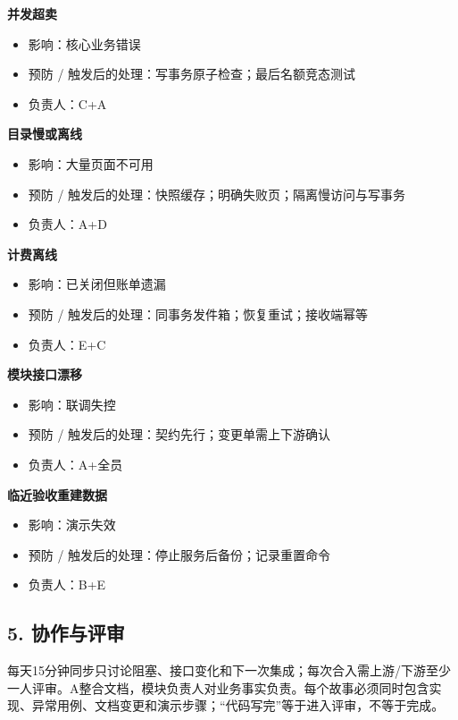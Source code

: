 \documentclass[UTF8,11pt,a4paper]{ctexart}
\providecommand{\tightlist}{\setlength{\itemsep}{0pt}\setlength{\parskip}{0pt}}
\begin{document}
\textbf{并发超卖}

\begin{itemize}
\tightlist
\item
  影响：核心业务错误
\item
  预防 / 触发后的处理：写事务原子检查；最后名额竞态测试
\item
  负责人：C+A
\end{itemize}

\textbf{目录慢或离线}

\begin{itemize}
\tightlist
\item
  影响：大量页面不可用
\item
  预防 / 触发后的处理：快照缓存；明确失败页；隔离慢访问与写事务
\item
  负责人：A+D
\end{itemize}

\textbf{计费离线}

\begin{itemize}
\tightlist
\item
  影响：已关闭但账单遗漏
\item
  预防 / 触发后的处理：同事务发件箱；恢复重试；接收端幂等
\item
  负责人：E+C
\end{itemize}

\textbf{模块接口漂移}

\begin{itemize}
\tightlist
\item
  影响：联调失控
\item
  预防 / 触发后的处理：契约先行；变更单需上下游确认
\item
  负责人：A+全员
\end{itemize}

\textbf{临近验收重建数据}

\begin{itemize}
\tightlist
\item
  影响：演示失效
\item
  预防 / 触发后的处理：停止服务后备份；记录重置命令
\item
  负责人：B+E
\end{itemize}

\hypertarget{5-ux534fux4f5cux4e0eux8bc4ux5ba1}{%
\subsection{5. 协作与评审}\label{5-ux534fux4f5cux4e0eux8bc4ux5ba1}}

每天15分钟同步只讨论阻塞、接口变化和下一次集成；每次合入需上游/下游至少一人评审。A整合文档，模块负责人对业务事实负责。每个故事必须同时包含实现、异常用例、文档变更和演示步骤；``代码写完''等于进入评审，不等于完成。
\end{document}

